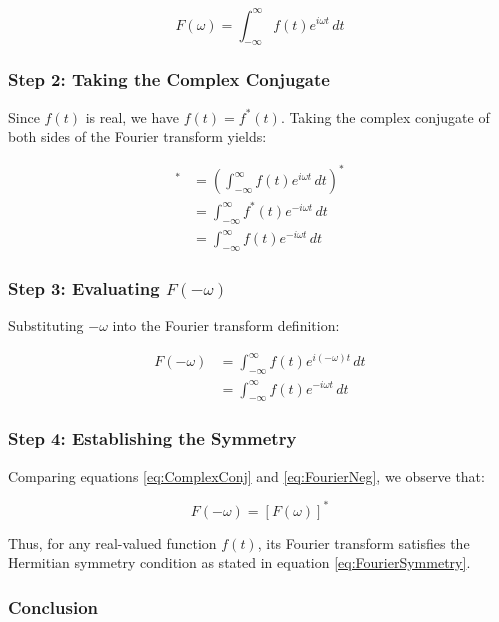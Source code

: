 \documentclass[12pt]{article}
\begin{document}
\begin{equation}
F(\omega) = \int_{-\infty}^{\infty} f(t) e^{i \omega t} \, dt \label{eq:FourierDef}
\end{equation}

\subsubsection*{Step 2: Taking the Complex Conjugate}

Since \( f(t) \) is real, we have \( f(t) = f^*(t) \). Taking the complex conjugate of both sides of the Fourier transform yields:

\begin{align}
[F(\omega)]^* &= \left( \int_{-\infty}^{\infty} f(t) e^{i \omega t} \, dt \right)^* \nonumber \\
&= \int_{-\infty}^{\infty} f^*(t) e^{-i \omega t} \, dt \nonumber \\
&= \int_{-\infty}^{\infty} f(t) e^{-i \omega t} \, dt \label{eq:ComplexConj}
\end{align}

\subsubsection*{Step 3: Evaluating \( F(-\omega) \)}

Substituting \( -\omega \) into the Fourier transform definition:

\begin{align}
F(-\omega) &= \int_{-\infty}^{\infty} f(t) e^{i (-\omega) t} \, dt \nonumber \\
&= \int_{-\infty}^{\infty} f(t) e^{-i \omega t} \, dt \label{eq:FourierNeg}
\end{align}

\subsubsection*{Step 4: Establishing the Symmetry}

Comparing equations \eqref{eq:ComplexConj} and \eqref{eq:FourierNeg}, we observe that:

\[
F(-\omega) = [F(\omega)]^*
\]

Thus, for any real-valued function \( f(t) \), its Fourier transform satisfies the Hermitian symmetry condition as stated in equation \eqref{eq:FourierSymmetry}.

\subsubsection*{Conclusion}
\end{document}
